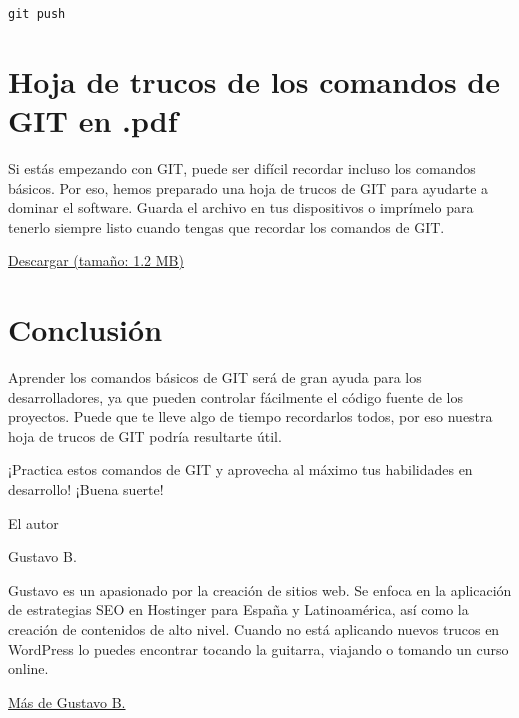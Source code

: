 \documentclass[
  a2paper,
]{article}
\begin{document}
\texttt{git\ push}

\hypertarget{hoja-de-trucos-de-los-comandos-de-git-en-.pdf}{%
\section{Hoja de trucos de los comandos de GIT en
.pdf}\label{hoja-de-trucos-de-los-comandos-de-git-en-.pdf}}

Si estás empezando con GIT, puede ser difícil recordar incluso los
comandos básicos. Por eso, hemos preparado una hoja de trucos de GIT
para ayudarte a dominar el software. Guarda el archivo en tus
dispositivos o imprímelo para tenerlo siempre listo cuando tengas que
recordar los comandos de GIT.

\href{https://cdn.hostinger.com/tutorials/pdf/Git-Cheat-Sheet-EN.pdf}{Descargar
(tamaño: 1.2 MB)}

\hypertarget{conclusiuxf3n-1}{%
\section{Conclusión}\label{conclusiuxf3n-1}}

Aprender los comandos básicos de GIT será de gran ayuda para los
desarrolladores, ya que pueden controlar fácilmente el código fuente de
los proyectos. Puede que te lleve algo de tiempo recordarlos todos, por
eso nuestra hoja de trucos de GIT podría resultarte útil.

¡Practica estos comandos de GIT y aprovecha al máximo tus habilidades en
desarrollo! ¡Buena suerte!

El autor~~

Gustavo B.

Gustavo es un apasionado por la creación de sitios web. Se enfoca en la
aplicación de estrategias SEO en Hostinger para España y Latinoamérica,
así como la creación de contenidos de alto nivel. Cuando no está
aplicando nuevos trucos en WordPress lo puedes encontrar tocando la
guitarra, viajando o tomando un curso online.~~

\href{https://www.hostinger.es/tutoriales/author/gustavohostinger}{Más
de Gustavo B.}


\printbibliography
\end{document}
